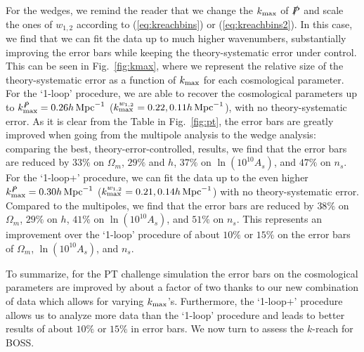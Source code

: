 \documentclass[12pt,a4paper]{article}
\def\hinvMpc{h\,{\rm Mpc}^{-1}}
\def\PA{\slashed{P}}
\renewcommand{\(}{\left(}
\renewcommand{\)}{\right)}
\begin{document}
{ For the wedges, we remind the reader that we change the $k_{\rm max}$ of $\PA$ and scale the ones of $w_{1,2}$ according to (\ref{eq:kreachbins}) or (\ref{eq:kreachbins2}). In this case, we find that we can fit the data up to much higher {wavenumbers}, substantially improving the error bars while keeping the theory-systematic error under control. 
This can be seen in Fig.~\ref{fig:kmax}, where we represent the relative size of the theory-systematic error as a function of $k_{\rm max}$ for each cosmological parameter. 
For the `1-loop' procedure, we are able to recover the cosmological parameters up to $k_{\rm max}^{\PA} = 0.26 \hinvMpc$ ($k_{\rm max}^{w_{1,2}} = 0.22, 0.11 \hinvMpc$), with no theory-systematic error. 
As it is clear from the Table in Fig.~\ref{fig:pt}, the error bars are greatly improved when going from the multipole analysis to the wedge analysis: comparing the best, theory-error-controlled, results, we find that the error bars are reduced by $33\%$ on $\Omega_m$, $29\%$ and $h$, $37\%$ on $\ln (10^{10} A_s)$, and $47\%$ on $n_s$. 
For the `1-loop+' procedure, we can fit the data up to the even higher $k_{\rm max}^{\PA} = 0.30 \hinvMpc$ ($k_{\rm max}^{w_{1,2}} = 0.21, 0.14 \hinvMpc$) with no theory-systematic error. 
Compared to the multipoles, we find that the error bars are reduced by $38\%$ on $\Omega_m$, $29\%$ on $h$, $41\%$ on $\ln (10^{10} A_s)$, and $51\%$ on $n_s$. 
This represents an improvement over the `1-loop' procedure of about $10\%$ or $15\%$ on the error bars of $\Omega_m$,  $\ln (10^{10} A_s)$, and $n_s$. 

To summarize, for the PT challenge simulation the error bars on the cosmological parameters are improved by about a factor of two thanks to our new combination of data which allows for varying $k_{\rm max}$'s. Furthermore, the `1-loop+' procedure allows us to analyze more data than the `1-loop' procedure and leads to better results of about $10\%$ or $15\%$ in error bars. 
We now turn to assess the $k$-reach for BOSS. 

}
\end{document}
